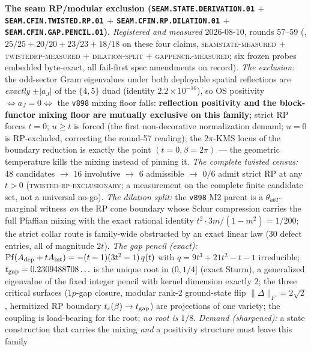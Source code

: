 \par\smallskip\noindent\textbf{The seam RP/modular exclusion
(\texttt{SEAM.STATE.\allowbreak DERIVATION.01} $+$
\texttt{SEAM.CFIN.TWISTED.\allowbreak RP.01} $+$
\texttt{SEAM.CFIN.RP.\allowbreak DILATION.01} $+$
\texttt{SEAM.CFIN.GAP.\allowbreak PENCIL.01}).}
{\sloppy
\emph{Registered and measured} 2026-08-10, rounds 57--59
(, $25/25 + 20/20 + 23/23 +
18/18$ on these four claims, \textsc{seamstate-measured} $+$
\textsc{twistedrp-measured} $+$ \textsc{dilation-split} $+$
\textsc{gappencil-measured}; six frozen probes embedded
byte-exact, all fail-first spec amendments on record).
\emph{The exclusion:} the odd-sector Gram eigenvalues under both
deployable spatial reflections are \emph{exactly} $\pm|a_J|$ of
the $\{4,5\}$ duad (identity $2.2\times10^{-16}$), so OS
positivity $\iff a_J = 0 \iff$ the \texttt{v898} mixing floor
falls: \textbf{reflection positivity and the block-functor mixing
floor are mutually exclusive on this family}; strict RP forces
$t = 0$; $u \ge t$ is forced (the first non-decorative
normalization demand; $u = 0$ is RP-excluded, correcting the
round-57 reading); the $2\pi$-KMS locus of the boundary reduction
is exactly the point $(t{=}0, \beta{=}2\pi)$ --- the geometric
temperature kills the mixing instead of pinning it.  \emph{The
complete twisted census:} $48$ candidates $\to$ $16$ involutive
$\to$ $6$ admissible $\to$ $0/6$ admit strict RP at any $t > 0$
(\textsc{twisted-rp-exclusionary}; a measurement on the complete
finite candidate set, not a universal no-go).  \emph{The dilation
split:} the \texttt{v898} M2 parent is a $\theta_{abT}$-marginal
witness \emph{on} the RP cone boundary whose Schur compression
carries the full Pfaffian mixing with the exact rational identity
$t^2 \cdot 3m/(1-m^2) = 1/200$; the strict collar route is
family-wide obstructed by an exact linear law ($30$ defect
entries, all of magnitude $2t$).  \emph{The gap pencil (exact):}
$\operatorname{Pf}(A_{\rm dep} + t A_{\rm int}) =
-(t-1)(3t^2-1)\,q(t)$ with $q = 9t^3 + 21t^2 - t - 1$
irreducible; $t_{\rm gap} = 0.2309488708\ldots$ is the unique
root in $(0, 1/4]$ (exact Sturm), a generalized eigenvalue of the
fixed integer pencil with kernel dimension exactly $2$; the three
critical surfaces ($1p$-gap closure, modular rank-2 ground-state
flip $\|\Delta\|_F = 2\sqrt2$, hermitized RP boundary
$t_c(\beta) \to t_{\rm gap}$) are projections of one variety; the
coupling is load-bearing for the root; \emph{no root is} $1/8$.
\emph{Demand (sharpened):} a state construction that carries the
mixing \emph{and} a positivity structure must leave this family
}
